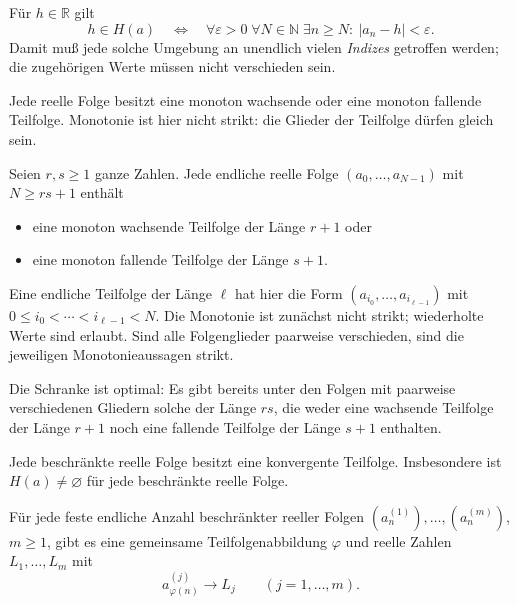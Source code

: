 \begin{theorem}
\label{b21guide:thm:cluster-test}
Für $h\in\mathbb R$ gilt
\[
 h\in H(a)
 \quad\Longleftrightarrow\quad
 \forall\varepsilon>0\;\forall N\in\mathbb N\;
 \exists n\geq N:\ |a_n-h|<\varepsilon.
\]
Damit muß jede solche Umgebung an unendlich vielen \emph{Indizes}
getroffen werden; die zugehörigen Werte müssen nicht verschieden sein.
\end{theorem}

\begin{theorem}
\label{b21guide:thm:monotone-subsequence}
Jede reelle Folge besitzt eine monoton wachsende oder eine
monoton fallende Teilfolge. Monotonie ist hier nicht strikt:
die Glieder der Teilfolge dürfen gleich sein.
\end{theorem}

\begin{theorem}
\label{b21guide:thm:erdos-szekeres}
Seien $r,s\geq1$ ganze Zahlen. Jede endliche reelle Folge
$(a_0,\ldots,a_{N-1})$ mit $N\geq rs+1$ enthält
\begin{itemize}
 \item eine monoton wachsende Teilfolge der Länge $r+1$ oder
 \item eine monoton fallende Teilfolge der Länge $s+1$.
\end{itemize}
Eine endliche Teilfolge der Länge $\ell$ hat hier die Form
$(a_{i_0},\ldots,a_{i_{\ell-1}})$ mit
$0\leq i_0<\cdots<i_{\ell-1}<N$.
Die Monotonie ist zunächst nicht strikt; wiederholte Werte sind erlaubt.
Sind alle Folgenglieder paarweise verschieden, sind die
jeweiligen Monotonieaussagen strikt.

Die Schranke ist optimal: Es gibt bereits unter den Folgen mit
paarweise verschiedenen Gliedern solche der Länge $rs$, die
weder eine wachsende Teilfolge der Länge $r+1$ noch eine
fallende Teilfolge der Länge $s+1$ enthalten.
\end{theorem}

\begin{theorem}
\label{b21guide:thm:bw}
Jede beschränkte reelle Folge besitzt eine konvergente Teilfolge.
Insbesondere ist $H(a)\ne\varnothing$ für jede beschränkte
reelle Folge.

Für jede feste endliche Anzahl beschränkter reeller Folgen
$(a_n^{(1)}),\ldots,(a_n^{(m)})$, $m\geq1$, gibt es eine
gemeinsame Teilfolgenabbildung $\varphi$ und reelle Zahlen
$L_1,\ldots,L_m$ mit
\[
 a_{\varphi(n)}^{(j)}\longrightarrow L_j
 \qquad(j=1,\ldots,m).
\]
\end{theorem}

